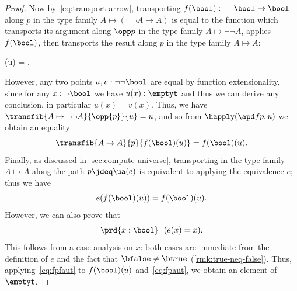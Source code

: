 \begin{proof}
  Now by~\eqref{eq:transport-arrow}, transporting $f(\bool):\neg\neg\bool\to\bool$ along $p$ in the type family ${A\mapsto (\neg\neg A \to A)}$ is equal to the function which transports its argument along $\opp p$ in the type family $A\mapsto \neg\neg A$, applies $f(\bool)$, then transports the result along $p$ in the type family $A\mapsto A$:
  \begin{narrowmultline*}
    (u) =
    \narrowbreak
    .
  \end{narrowmultline*}
  However, any two points $u,v:\neg\neg\bool$ are equal by function extensionality, since for any $x:\neg\bool$ we have $u(x):\emptyt$ and thus we can derive any conclusion, in particular $u(x)=v(x)$.
  Thus, we have $\transfib{A\mapsto \neg\neg A}{\opp{p}}{u} = u$, and so from $\happly(\apd f p,u)$ we obtain an equality
  \[ \transfib{A\mapsto A}{p}{f(\bool)(u)} = f(\bool)(u).\]
  Finally, as discussed in \cref{sec:compute-universe}, transporting in the type family $A\mapsto A$ along the path $p\jdeq \ua(e)$ is equivalent to applying the equivalence $e$; thus we have
  \begin{equation}
    e(f(\bool)(u)) = f(\bool)(u).\label{eq:fpaut}
  \end{equation}
  However, we can also prove that
  \begin{equation}
    \prd{x:\bool} \neg(e(x)=x).\label{eq:fpfaut}
  \end{equation}
  This follows from a case analysis on $x$: both cases are immediate from the definition of $e$ and the fact that $\bfalse\neq\btrue$ (\cref{rmk:true-neq-false}).
  Thus, applying~\eqref{eq:fpfaut} to $f(\bool)(u)$ and~\eqref{eq:fpaut}, we obtain an element of $\emptyt$.
\end{proof}
